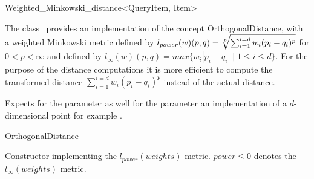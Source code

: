 

\begin{ccRefClass}{Weighted_Minkowski_distance<QueryItem, Item>}  %


\ccDefinition
  
The class \ccRefName\ provides an implementation of the concept OrthogonalDistance, with a weighted Minkowski metric
defined by $l_{power}(w)(p,q)=\root p\of {\sum_{i=1}^{i=d} w_i(p_i-q_i)^p}$ for $0 < p <\infty$ and
defined by $l_{\infty}(w)(p,q)=max \{w_i |p_i-q_i| \mid 1 \leq i \leq d\}$.
For the purpose of the distance computations it is more efficient to compute
the transformed distance ${\sum_{i=1}^{i=d} w_i(p_i-q_i)^p}$ instead of the actual distance.


\ccParameters

Expects for the parameter  as well for the parameter
 an implementation
of a $d$-dimensional point
for example .

\ccIsModel

OrthogonalDistance

\ccTypes

 

\ccCreation
{}  %


{Constructor implementing the $l_{power}(weights)$ metric. $power \leq 0$ denotes the $l_{\infty}(weights)$ metric.}


\end{ccRefClass}
